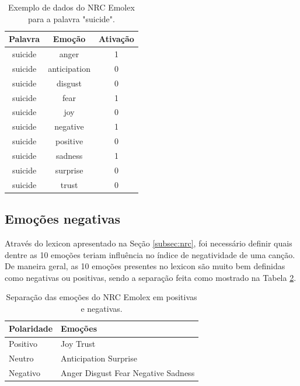 \begin{table}[h]
	\centering
	\begin{tabular}{|c|c|c|}
		\hline
		\textbf{Palavra} & \textbf{Emoção} & \textbf{Ativação} \\ \hline
		suicide & anger & 1 \\ \hline
		suicide & anticipation & 0 \\ \hline
		suicide & disgust & 0 \\ \hline
		suicide & fear & 1 \\ \hline
		suicide & joy & 0 \\ \hline
		suicide & negative & 1 \\ \hline
		suicide & positive & 0 \\ \hline
		suicide & sadness & 1 \\ \hline
		suicide & surprise & 0 \\ \hline
		suicide & trust & 0 \\ \hline
	\end{tabular}
	\caption{\label{tab:emolexword} Exemplo de dados do NRC Emolex para a 
	palavra "suicide".}
\end{table}

\subsection{Emoções negativas} \label{subsec:negemo}

Através do lexicon apresentado na Seção \ref{subsec:nrc}, foi necessário
definir quais dentre as 10 emoções teriam influência no índice de 
negatividade de uma canção. De maneira geral, as 10 emoções presentes 
no lexicon são muito bem definidas como negativas ou positivas, sendo
a separação feita como mostrado na Tabela \ref{tab:emolexposneg}.

\begin{table}[h]
	\centering
	\begin{tabular}{|l|p{20mm}|}
		\hline
		\textbf{Polaridade} & \textbf{Emoções} \\ \hline
		Positivo & Joy \newline Trust \\ \hline
		Neutro & Anticipation \newline Surprise \\ \hline
		Negativo & Anger \newline Disgust \newline Fear 
		\newline Negative \newline Sadness \\ \hline
	\end{tabular}
	\caption{\label{tab:emolexposneg} Separação das emoções do NRC Emolex em
	positivas e negativas.}
\end{table}


